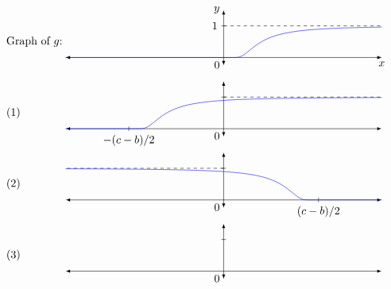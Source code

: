 \documentclass[../../main]{subfiles}
\begin{document}
\renewcommand\floatpagefraction{.1}
\begin{figure}[p!]
\[
\begin{tikzpicture}
    \begin{scope}
    \draw (-7,0.5) node[anchor=west] {Graph of $g$:};
    \draw[latex-latex]
        (-5,0)--
        (0,0) node[anchor=north east] {$0$} --
        (5,0) node[anchor=north] {$x$};
    \draw[latex-latex] (0,-0.25)--(0,1.5) node[anchor=east] {$y$};
    \draw (2pt,1)--(-2pt,1) node[anchor=east] {$1$};
    \draw[dashed] (0,1)--(5,1);
    
    \draw[blue] (-5,0)--(0,0);
    \draw[blue, domain=0.01:5, samples=100]
        plot (\x, {exp(-1/(\x*\x))} );
    \end{scope}
    
    \begin{scope}[shift={(0,-2.25)}]
    \draw (-7,0.5) node[anchor=west] {(1)};
    \draw[latex-latex]
        (-5,0)--
        (0,0) node[anchor=north east] {$0$} --
        (5,0);
    \draw[latex-latex] (0,-0.25)--(0,1.5) ;
    \draw (2pt,1)--(-2pt,1) node[anchor=east] {};
    \draw[dashed] (0,1)--(5,1);
    
    \draw (-3,2pt)--(-3,-2pt) node[anchor=north] {$-(c-b)/2$};
    
    \draw[blue] (-5,0)--(-3,0);
    \draw[blue, domain=0.01:8, samples=100]
        plot (\x-3, {exp(-1/(\x*\x))} );
    \end{scope}
    
    \begin{scope}[shift={(0,-4.5)}]
    \draw (-7,0.5) node[anchor=west] {(2)};
    \draw[latex-latex]
        (-5,0)--
        (0,0) node[anchor=north east] {$0$} --
        (5,0);
    \draw[latex-latex] (0,-0.25)--(0,1.5) ;
    \draw (2pt,1)--(-2pt,1) node[anchor=east] {};
    \draw[dashed] (0,1)--(-5,1);
    
    \draw (3,2pt)--(3,-2pt) node[anchor=north] {$(c-b)/2$};
    
    \draw[blue] (5,0)--(3,0);
    \draw[blue, domain=0.01:8, samples=100]
        plot (3-\x, {exp(-1/(\x*\x))} );
    \end{scope}
    
    \begin{scope}[shift={(0,-6.75)}]
    \draw (-7,0.5) node[anchor=west] {(3)};
    \draw[latex-latex]
        (-5,0)--
        (0,0) node[anchor=north east] {$0$} --
        (5,0);
    \draw[latex-latex] (0,-0.25)--(0,1.5) ;
    \draw (2pt,1)--(-2pt,1) node[anchor=east] {};
    

\end{scope}
\end{tikzpicture}\]
\end{figure}
\end{document}
